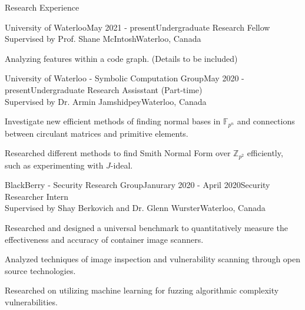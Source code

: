 \documentclass{cv}
\begin{document}
\begin{rSection}{Research Experience}
\begin{rSubsection}{University of Waterloo}{May 2021 - present}{Undergraduate Research Fellow \\ Supervised by Prof. Shane McIntosh}{Waterloo, Canada}
	\item Analyzing features within a code graph. (Details to be included)
\end{rSubsection}

\begin{rSubsection}{University of Waterloo - Symbolic Computation Group}{May 2020 - present}{Undergraduate Research Assisstant (Part-time)\\ Supervised by Dr. Armin Jamshidpey}{Waterloo, Canada}
    \item Investigate new efficient methods of finding normal bases in $\mathbb{F}_{p^n}$ and connections between circulant matrices and primitive elements.
  	\item Researched different methods to find Smith Normal Form over $\mathbb{Z}_{p^2}$ efficiently, such as experimenting with $J$-ideal.
\end{rSubsection}

\begin{rSubsection}{BlackBerry - Security Research Group}{Janurary 2020 - April 2020}{Security Researcher Intern \\ Supervised by Shay Berkovich and Dr. Glenn Wurster}{Waterloo, Canada}
	\item Researched and designed a universal benchmark to quantitatively measure the effectiveness and accuracy of container image scanners.
	\item Analyzed techniques of image inspection and vulnerability scanning through open source technologies.
	\item Researched on utilizing machine learning for fuzzing algorithmic complexity vulnerabilities.
\end{rSubsection}
\end{rSection}
\end{document}
